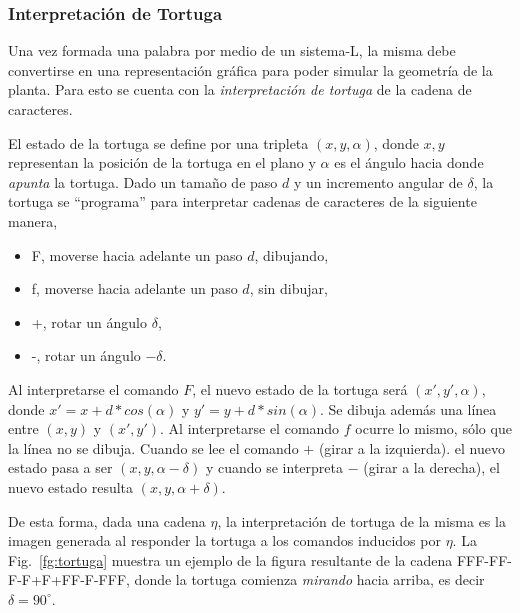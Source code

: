 \subsubsection{Interpretación de Tortuga}
Una vez formada una palabra por medio de un sistema-L, la misma debe convertirse en una representación gráfica para poder simular la geometría de la planta.
Para esto se cuenta con la {\em interpretación de tortuga} de la cadena de caracteres.

El estado de la tortuga se define por una tripleta $(x,y,\alpha)$, donde $x,y$ representan la posición de la tortuga en el plano y $\alpha$ es el ángulo hacia donde {\em apunta} la tortuga.
Dado un tamaño de paso $d$ y un incremento angular de $\delta$, la tortuga se ``programa'' para interpretar cadenas de caracteres de la siguiente manera,

\begin{itemize}
\item F, moverse hacia adelante un paso $d$, dibujando,
\item f, moverse hacia adelante un paso $d$, sin dibujar,
\item +, rotar un ángulo $\delta$,
\item -, rotar un ángulo $-\delta$.
\end{itemize}

Al interpretarse el comando $F$, el nuevo estado de la tortuga será $(x',y',\alpha)$, donde $x' = x + d * cos(\alpha)$ y $y' = y + d * sin(\alpha)$. Se dibuja además una línea entre $(x,y)$ y $(x',y')$.
Al interpretarse el comando $f$ ocurre lo mismo, sólo que la línea no se dibuja.
Cuando se lee el comando $+$ (girar a la izquierda). el nuevo estado pasa a ser $(x,y,\alpha-\delta)$ y cuando se interpreta $-$ (girar a la derecha), el nuevo estado resulta $(x,y,\alpha+\delta)$.

De esta forma, dada una cadena $\eta$, la interpretación de tortuga de la misma es la imagen generada al responder la tortuga a los comandos inducidos por $\eta$.
La Fig.~\ref{fg:tortuga} muestra un ejemplo de la figura resultante de la cadena FFF-FF-F-F+F+FF-F-FFF, donde la tortuga comienza {\em mirando} hacia arriba, es decir $\delta = 90^{\circ}$.

